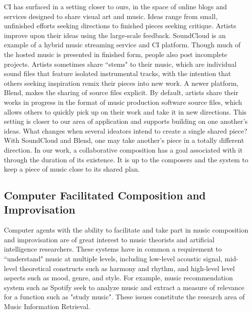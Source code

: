 \documentclass[final,authoryear,5p,times,twocolumn]{elsarticle}
\begin{document}
CI has surfaced in a setting closer to ours, in the space of online blogs and services designed to share visual art and music. Ideas range from small, unfinished efforts seeking directions to finished pieces seeking critique. Artists improve upon their ideas using the large-scale feedback. SoundCloud is an example of a hybrid music streaming service and CI platform. Though much of the hosted music is presented in finished form, people also post incomplete projects. Artists sometimes share ``stems" to their music, which are individual sound files that feature isolated instrumental tracks, with the intention that others seeking inspiration remix their pieces into new work. A newer platform, Blend, makes the sharing of source files explicit. By default, artists share their works in progress in the format of music production software source files, which allows others to quickly pick up on their work and take it in new directions. This setting is closer to our area of application and supports building on one another's ideas.  What changes when several ideators intend to create a single shared piece? With SoundCloud and Blend, one may take another's piece in a totally different direction. In our work, a collaborative composition has a goal associated with it through the duration of its existence. It is up to the composers and the system to keep a piece of music close to its shared plan.

\subsection{Computer Facilitated Composition and Improvisation}

Computer agents with the ability to facilitate and take part in music composition and improvisation are of great interest to music theorists and artificial intelligence researchers. These systems have in common a requirement to ``understand" music at multiple levels, including low-level acoustic signal, mid-level theoretical constructs such as harmony and rhythm, and high-level level aspects such as mood, genre, and style. For example, music recommendation system such as Spotify seek to analyze music and extract a measure of relevance for a function such as "study music". These issues constitute the research area of Music Information Retrieval.
\end{document}
